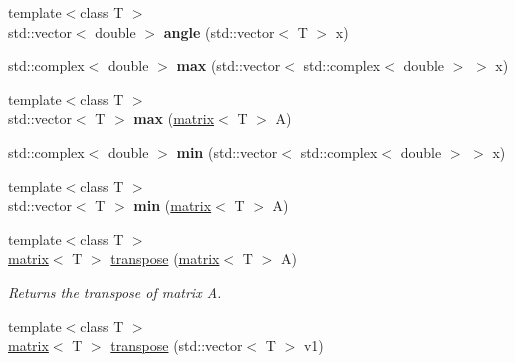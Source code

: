 \begin{DoxyCompactItemize}
\item 
\hypertarget{namespacekeycpp_a13ee1c3dd9cbb21a325260188a7fa860}{{\footnotesize template$<$class T $>$ }\\std\-::vector$<$ double $>$ {\bfseries angle} (std\-::vector$<$ T $>$ x)}\label{namespacekeycpp_a13ee1c3dd9cbb21a325260188a7fa860}

\item 
\hypertarget{namespacekeycpp_a73269c9db9fe25412819858bd7048ae5}{std\-::complex$<$ double $>$ {\bfseries max} (std\-::vector$<$ std\-::complex$<$ double $>$ $>$ x)}\label{namespacekeycpp_a73269c9db9fe25412819858bd7048ae5}

\item 
\hypertarget{namespacekeycpp_aed77b31791ec78800e98ace1cbc3693d}{{\footnotesize template$<$class T $>$ }\\std\-::vector$<$ T $>$ {\bfseries max} (\hyperlink{classkeycpp_1_1matrix}{matrix}$<$ T $>$ A)}\label{namespacekeycpp_aed77b31791ec78800e98ace1cbc3693d}

\item 
\hypertarget{namespacekeycpp_ab7577228b38fa6a1911ac65fb80832f3}{std\-::complex$<$ double $>$ {\bfseries min} (std\-::vector$<$ std\-::complex$<$ double $>$ $>$ x)}\label{namespacekeycpp_ab7577228b38fa6a1911ac65fb80832f3}

\item 
\hypertarget{namespacekeycpp_a8d8183bfe936dc877f32f86a43daa1b4}{{\footnotesize template$<$class T $>$ }\\std\-::vector$<$ T $>$ {\bfseries min} (\hyperlink{classkeycpp_1_1matrix}{matrix}$<$ T $>$ A)}\label{namespacekeycpp_a8d8183bfe936dc877f32f86a43daa1b4}

\item 
\hypertarget{namespacekeycpp_ad68697505d1a1a85f30a18b0e9b0eb2f}{{\footnotesize template$<$class T $>$ }\\\hyperlink{classkeycpp_1_1matrix}{matrix}$<$ T $>$ \hyperlink{namespacekeycpp_ad68697505d1a1a85f30a18b0e9b0eb2f}{transpose} (\hyperlink{classkeycpp_1_1matrix}{matrix}$<$ T $>$ A)}\label{namespacekeycpp_ad68697505d1a1a85f30a18b0e9b0eb2f}

\begin{DoxyCompactList}\small\item\em Returns the transpose of matrix A. \end{DoxyCompactList}\item 
\hypertarget{namespacekeycpp_aa148d677899a0da5ab14edfc5057a97b}{{\footnotesize template$<$class T $>$ }\\\hyperlink{classkeycpp_1_1matrix}{matrix}$<$ T $>$ \hyperlink{namespacekeycpp_aa148d677899a0da5ab14edfc5057a97b}{transpose} (std\-::vector$<$ T $>$ v1)}\label{namespacekeycpp_aa148d677899a0da5ab14edfc5057a97b}


\end{DoxyCompactItemize}
